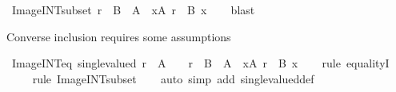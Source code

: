 \begin{isabellebody}
%
\isadelimproof
\isanewline
%
\endisadelimproof
\isanewline
{}\isamarkupfalse%
\ Image{\isacharunderscore}{\kern0pt}INT{\isacharunderscore}{\kern0pt}subset{\isacharcolon}{\kern0pt}\ {\isachardoublequoteopen}{\isacharparenleft}{\kern0pt}r\ {\isacharbackquote}{\kern0pt}{\isacharbackquote}{\kern0pt}\ {\isacharparenleft}{\kern0pt}{\isasymInter}{\isacharparenleft}{\kern0pt}B\ {\isacharbackquote}{\kern0pt}\ A{\isacharparenright}{\kern0pt}{\isacharparenright}{\kern0pt}{\isacharparenright}{\kern0pt}\ {\isasymsubseteq}\ {\isacharparenleft}{\kern0pt}{\isasymInter}x{\isasymin}A{\isachardot}{\kern0pt}\ r\ {\isacharbackquote}{\kern0pt}{\isacharbackquote}{\kern0pt}\ {\isacharparenleft}{\kern0pt}B\ x{\isacharparenright}{\kern0pt}{\isacharparenright}{\kern0pt}{\isachardoublequoteclose}\isanewline
%
\isadelimproof
\ \ %
\endisadelimproof
%
\isatagproof
{}\isamarkupfalse%
\ blast%
\endisatagproof
{\isafoldproof}%
%
\isadelimproof
%
\endisadelimproof
%
\begin{isamarkuptext}%
Converse inclusion requires some assumptions%
\end{isamarkuptext}\isamarkuptrue%
\isamarkupfalse%
\ Image{\isacharunderscore}{\kern0pt}INT{\isacharunderscore}{\kern0pt}eq{\isacharcolon}{\kern0pt}\ {\isachardoublequoteopen}single{\isacharunderscore}{\kern0pt}valued\ {\isacharparenleft}{\kern0pt}r{\isasyminverse}{\isacharparenright}{\kern0pt}\ {\isasymLongrightarrow}\ A\ {\isasymnoteq}\ {\isacharbraceleft}{\kern0pt}{\isacharbraceright}{\kern0pt}\ {\isasymLongrightarrow}\ r\ {\isacharbackquote}{\kern0pt}{\isacharbackquote}{\kern0pt}\ {\isacharparenleft}{\kern0pt}{\isasymInter}{\isacharparenleft}{\kern0pt}B\ {\isacharbackquote}{\kern0pt}\ A{\isacharparenright}{\kern0pt}{\isacharparenright}{\kern0pt}\ {\isacharequal}{\kern0pt}\ {\isacharparenleft}{\kern0pt}{\isasymInter}x{\isasymin}A{\isachardot}{\kern0pt}\ r\ {\isacharbackquote}{\kern0pt}{\isacharbackquote}{\kern0pt}\ B\ x{\isacharparenright}{\kern0pt}{\isachardoublequoteclose}\isanewline
%
\isadelimproof
\ \ %
\endisadelimproof
%
\isatagproof
{}\isamarkupfalse%
\ {\isacharparenleft}{\kern0pt}rule\ equalityI{\isacharparenright}{\kern0pt}\isanewline
\ \ \ \isamarkupfalse%
\ {\isacharparenleft}{\kern0pt}rule\ Image{\isacharunderscore}{\kern0pt}INT{\isacharunderscore}{\kern0pt}subset{\isacharparenright}{\kern0pt}\isanewline
\ \ \isamarkupfalse%
\ {\isacharparenleft}{\kern0pt}auto\ simp\ add{\isacharcolon}{\kern0pt}\ single{\isacharunderscore}{\kern0pt}valued{\isacharunderscore}{\kern0pt}def{\isacharparenright}{\kern0pt}\isanewline

\end{isabellebody}

